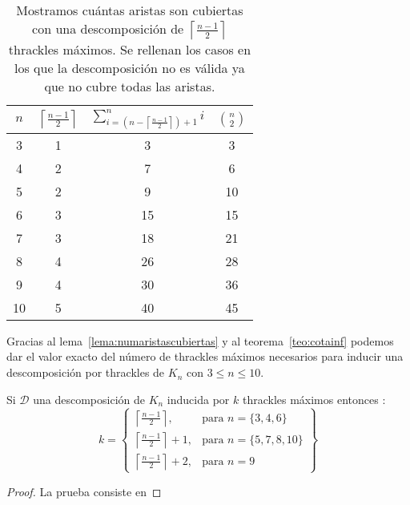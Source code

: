 \begin{table}[t]
  \centering
  \begin{tabular}{|c|c|c|c|}
    \hline
    $n$ & $\left\lceil\frac{n-1}{2}\right\rceil$ & $\sum^n_{i=\left(n-\left\lceil\frac{n-1}{2}\right\rceil\right) + 1}i$ & $\binom{n}{2}$\\[5pt] \hline\hline
    3   & 1  & 3 & 3 \\ \hline
    4   & 2  & 7 & 6 \\ \hline
    5   & 2  & \cellcolor{red!25}9 & 10 \\ \hline
    6   & 3  & 15 & 15 \\ \hline
    7   & 3  & \cellcolor{red!25}18 & 21 \\ \hline
    8   & 4  & \cellcolor{red!25}26 & 28 \\ \hline
    9   & 4  & \cellcolor{red!25}30 & 36 \\ \hline
    10  & 5  & \cellcolor{red!25}40 & 45 \\ \hline
  \end{tabular}
  \caption{ Mostramos cuántas aristas son cubiertas con una descomposición de $\left\lceil\frac{n-1}{2}\right\rceil$  thrackles
  máximos. Se rellenan los casos en los que la descomposición no es válida ya que no cubre todas las aristas. }
  \label{table:attrivialtight}
\end{table}

Gracias al lema~\ref{lema:numaristascubiertas} y al teorema~\ref{teo:cotainf} podemos
dar el valor exacto del número de thrackles máximos necesarios para inducir una
descomposición por thrackles de $K_n$ con $ 3\leq n \leq 10$.

\begin{theorem}\label{teo:nuevacotainf}
  Si $\mathcal{D}$ una descomposición de $K_n$ inducida por $k$ thrackles máximos
  entonces :
  \[
    k = \left\{ \begin{array}{lr}
      \left\lceil\frac{n-1}{2}\right\rceil,     & \text{para } n=\{3,4,6\}\\
      \left\lceil\frac{n-1}{2}\right\rceil + 1, & \text{para } n=\{5,7,8,10\}\\
      \left\lceil\frac{n-1}{2}\right\rceil + 2, & \text{para } n=9
    \end{array} \right\}
  \]
\end{theorem}
\begin{proof}
  La prueba consiste en 
\end{proof}
%
%

